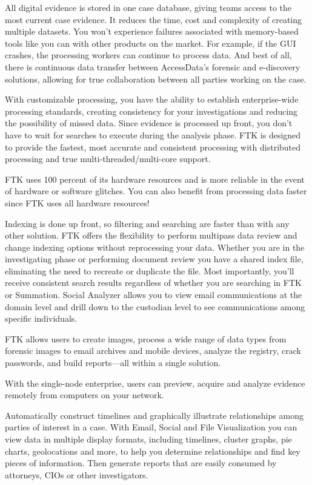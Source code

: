 All digital evidence is stored in one case database, giving teams access to the most current case evidence. It 
reduces the time, cost and complexity of creating multiple datasets. You won’t experience failures associated with 
memory-based tools like you can with other products on the market. For example, if the GUI crashes, the processing 
workers can continue to process data. And best of all, there is continuous data transfer between AccessData’s forensic 
and e-discovery solutions, allowing for true collaboration between all parties working on the case. 

With customizable processing, you have the ability to establish enterprise-wide processing standards, creating 
consistency for your investigations and reducing the possibility of missed data. Since evidence is processed up 
front, you don’t have to wait for searches to execute during the analysis phase. FTK is designed to provide the fastest, 
most accurate and consistent processing with distributed processing and true multi-threaded/multi-core support.

FTK uses 100 percent of its hardware resources and is more reliable in the event of hardware or software 
glitches. You can also benefit from processing data faster since FTK uses all hardware resources!

Indexing is done up front, so filtering and searching are faster than with any other solution. FTK offers 
the flexibility to perform multipass data review and change indexing options without reprocessing your 
data. Whether you are in the investigating phase or performing document review you have a shared index 
file, eliminating the need to recreate or duplicate the file. Most importantly, you’ll receive consistent search 
results regardless of whether you are searching in FTK or Summation. Social Analyzer allows you to view email 
communications at the domain level and drill down to the custodian level to see communications among 
specific individuals. 

FTK allows users to create images, process a wide range of data types from forensic images to email archives and 
mobile devices, analyze the registry, crack passwords, and build reports—all within a single solution. 

With the single-node enterprise, users can preview, acquire and analyze evidence remotely from computers 
on your network. 

Automatically construct timelines and graphically illustrate relationships among parties of interest in a 
case. With Email, Social and File Visualization you can view data in multiple display formats, including timelines, 
cluster graphs, pie charts, geolocations and more, to help you determine relationships and find key pieces 
of information. Then generate reports that are easily consumed by attorneys, CIOs or other investigators. 

